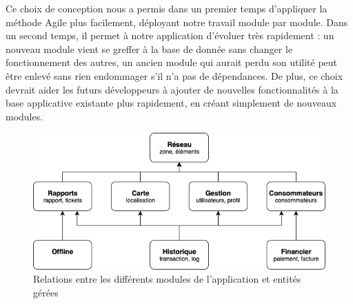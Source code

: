\documentclass{EPL-master-thesis-covers-FR}
\begin{document}
			Ce choix de conception nous a permis dans un premier temps d'appliquer la méthode Agile plus facilement, déployant notre travail module par module. Dans un second temps, il permet à notre application d'évoluer très rapidement : un nouveau module vient se greffer à la base de donnée sans changer le fonctionnement des autres, un ancien module qui aurait perdu son utilité peut être enlevé sans rien endommager s'il n'a pas de dépendances. De plus, ce choix devrait aider les futurs développeurs à ajouter de nouvelles fonctionnalités à la base applicative existante plus rapidement, en créant simplement de nouveaux modules.

			\begin{figure}
				\includegraphics[width=\textwidth]{images/modules}
				\caption{Relations entre les différents modules de l'application et entités gérées}
				\label{fig:modules}
			\end{figure}
\end{document}
